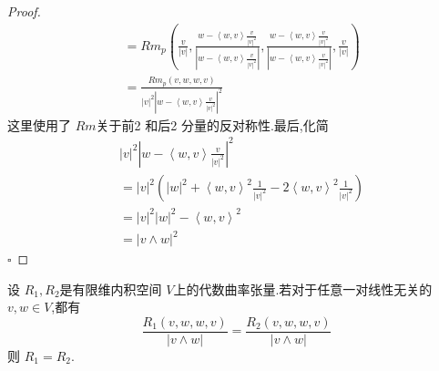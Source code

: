 \documentclass[../../几何与拓扑.tex]{subfiles}
\begin{document}
\begin{proof}
\[\begin{aligned}
      &=  Rm_{p}\left( \frac{v }{\left| v \right|  } ,\frac{w-\left<w,v \right>\frac{v }{\left| v \right|^{2}  }  }{ \left| w-\left<w,v \right> \frac{v }{\left| v \right|^{2}  }  \right| }  ,\frac{w-\left<w,v \right>\frac{v }{\left| v \right|^{2}  }  }{ \left| w-\left<w,v \right> \frac{v }{\left| v \right|^{2}  }  \right| }  ,\frac{v }{\left| v \right|  }  \right) \\ 
       &= \frac{Rm_{p}\left( v,w,w,v \right)  }{\left| v \right|^{2}\left| w- \left<w,v \right>\frac{v }{\left| v \right|^{2}  }  \right|^{2}   }   
    \end{aligned}
    \]这里使用了 \(  Rm  \)关于前2 和后2 分量的反对称性.最后,化简 \[
    \begin{aligned}
    &\left| v \right|^{2}\left| w-\left<w,v \right> \frac{v }{\left| v \right|^{2}  }  \right|^{2}\\ 
     &=   \left| v \right|^{2} \left( \left| w \right|^{2}+  \left<w,v \right>^{2}\frac{1 }{\left| v \right|^{2}  }   -2 \left<w,v \right>^{2} \frac{1 }{\left| v \right|^{2}  } \right)\\ 
      &= \left| v \right|^{2}\left| w \right|^{2}- \left<w,v \right>^{2}\\ 
       &= \left| v\wedge w \right|^{2}      
    \end{aligned}
    \] 
    \hfill $\square$
\end{proof}
\begin{proposition}
    设 \(  R_1,R_2  \)是有限维内积空间 \(  V  \)上的代数曲率张量.若对于任意一对线性无关的 \(  v,w \in V  \),都有 \[
    \frac{R_1\left( v,w,w,v \right)  }{\left| v\wedge w \right|  }= \frac{R_2\left( v,w,w,v \right)  }{\left| v\wedge w \right|  }  
    \]则 \(  R_1= R_2  \).    
\end{proposition}
\end{document}
